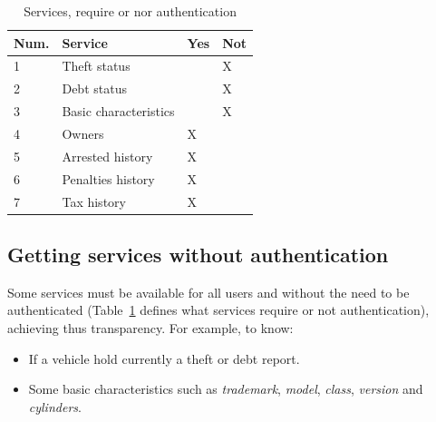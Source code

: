 \begin{table}[htb]
\footnotesize
    \begin{center}
    \caption{Services, require or nor authentication }
    \label{table:servicesPermits}
        \begin{tabular}{l|l|l|l}
			\textbf{Num.}&\textbf{Service}		 &Yes    &Not    \\ \hline
             1			 &Theft status           &       &X      \\ \hline
             2			 &Debt status            &       &X       \\ \hline
             3			 &Basic characteristics  &       &X       \\ \hline
             4			 &Owners                 &X      &       \\ \hline
             5			 &Arrested history       &X      &       \\ \hline
             6			 &Penalties history      &X      &       \\ \hline
             7			 &Tax history            &X      &       \\ \hline
        \end{tabular}
    \end{center}
\end{table}


\subsection{Getting services without authentication}
\label{ssec:getServNoAuth}
Some services must be available for all users and without the need to be 
authenticated 
(Table~\ref{table:servicesPermits} defines what services require or not authentication), 
achieving thus transparency. 
For example, to know:
\begin{itemize}
    \item If a vehicle hold currently a theft or debt report.
    \item Some basic characteristics such as \textit{trademark}, \textit{model}, 
        \textit{class}, \textit{version} and \textit{cylinders}.
\end{itemize}


